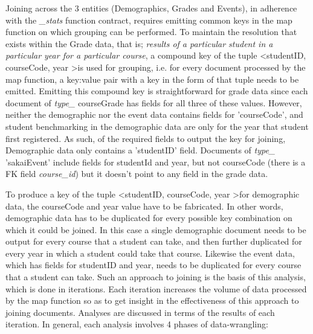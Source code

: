 Joining across the 3 entities (Demographics, Grades and Events), in adherence with the \textit{\_stats} function contract, requires emitting common keys in the map function on which grouping can be performed. To maintain the resolution that exists within the Grade data, that is; \textit{results of a particular student in a particular year for a particular course}, a compound key of the tuple \textless studentID, courseCode, year \textgreater is used for grouping, i.e. for every document processed by the map function, a key:value pair with a key in the form of that tuple needs to be emitted. Emitting this compound key is straightforward for grade data since each document of \textit{type\_} courseGrade has fields for all three of these values. However, neither the demographic nor the event data contains fields for 'courseCode', and student benchmarking in the demographic data are only for the year that student first registered. As such, of the required fields to output the key for joining, Demographic data only contains a 'studentID' field. Documents of \textit{type\_} 'sakaiEvent' include fields for studentId and year, but not courseCode (there is a FK field \textit{course\_id}) but it doesn't point to any field in the grade data.

To produce a key of the tuple \textless studentID, courseCode, year \textgreater for demographic data, the courseCode and year value have to be fabricated. In other words, demographic data has to be duplicated for every possible key combination on which it could be joined. In this case a single demographic document needs to be output for every course that a student can take, and then further duplicated for every year in which a student could take that course. Likewise the event data, which has fields for studentID and year, needs to be duplicated for every course that a student can take. Such an approach to joining is the basis of this analysis, which is done in iterations. Each iteration increases the volume of data processed by the map function so as to get insight in the effectiveness of this approach to joining documents. Analyses are discussed in terms of the results of each iteration. In general, each analysis involves 4 phases of data-wrangling:




